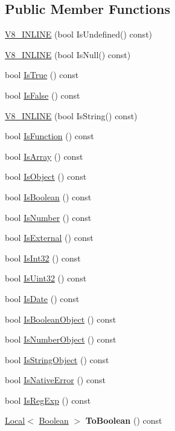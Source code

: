 \subsection*{Public Member Functions}
\begin{DoxyCompactItemize}
\item 
\hyperlink{classv8_1_1_value_ab7fe6f0f40ad56063af2b549d9c16938}{V8\+\_\+\+I\+N\+L\+I\+N\+E} (bool Is\+Undefined() const)
\item 
\hyperlink{classv8_1_1_value_a19bb214761816faf8b2784e4d78c9f21}{V8\+\_\+\+I\+N\+L\+I\+N\+E} (bool Is\+Null() const)
\item 
bool \hyperlink{classv8_1_1_value_a8f27462322186b295195eecb3e81d6d7}{Is\+True} () const 
\item 
bool \hyperlink{classv8_1_1_value_a68c0296071d01ca899825d7643cf495a}{Is\+False} () const 
\item 
\hyperlink{classv8_1_1_value_a14bd69255a9fd04fa641713188814958}{V8\+\_\+\+I\+N\+L\+I\+N\+E} (bool Is\+String() const)
\item 
bool \hyperlink{classv8_1_1_value_a05532a34cdd215f273163830ed8b77e7}{Is\+Function} () const 
\item 
bool \hyperlink{classv8_1_1_value_aaee0b144087d20eae02314c9393ff80f}{Is\+Array} () const 
\item 
bool \hyperlink{classv8_1_1_value_a355b7991c5c978c0341f6f961b63c5a2}{Is\+Object} () const 
\item 
bool \hyperlink{classv8_1_1_value_a0aceb7645e71b096df5cd73d1252b1b0}{Is\+Boolean} () const 
\item 
bool \hyperlink{classv8_1_1_value_a1bd51e3e55f67c65b9a8f587fbffb7c7}{Is\+Number} () const 
\item 
bool \hyperlink{classv8_1_1_value_a7ac61a325c18af8dcb6d7d5bf47d2503}{Is\+External} () const 
\item 
bool \hyperlink{classv8_1_1_value_a01e1db51c65b2feace248b7acbf71a2c}{Is\+Int32} () const 
\item 
bool \hyperlink{classv8_1_1_value_a783c89631bac4ef3c4b909f40cc2b8d8}{Is\+Uint32} () const 
\item 
bool \hyperlink{classv8_1_1_value_a8bc11fab0aded4a805722ab6df173cae}{Is\+Date} () const 
\item 
bool \hyperlink{classv8_1_1_value_abe7bc06283e5e66013f2f056a943168b}{Is\+Boolean\+Object} () const 
\item 
bool \hyperlink{classv8_1_1_value_a5f4aa9504a6d8fc3af9489330179fe14}{Is\+Number\+Object} () const 
\item 
bool \hyperlink{classv8_1_1_value_a3e0f2727455fd01a39a60b92f77e28e0}{Is\+String\+Object} () const 
\item 
bool \hyperlink{classv8_1_1_value_a579fb52e893cdc24f8b77e5acc77d06d}{Is\+Native\+Error} () const 
\item 
bool \hyperlink{classv8_1_1_value_aae41e43486937d6122c297a0d43ac0b8}{Is\+Reg\+Exp} () const 
\item 
\hypertarget{classv8_1_1_value_a73d653dc4a4999ce7258b40a4d8a1510}{}\hyperlink{classv8_1_1_local}{Local}$<$ \hyperlink{classv8_1_1_boolean}{Boolean} $>$ {\bfseries To\+Boolean} () const \label{classv8_1_1_value_a73d653dc4a4999ce7258b40a4d8a1510}


\end{DoxyCompactItemize}
